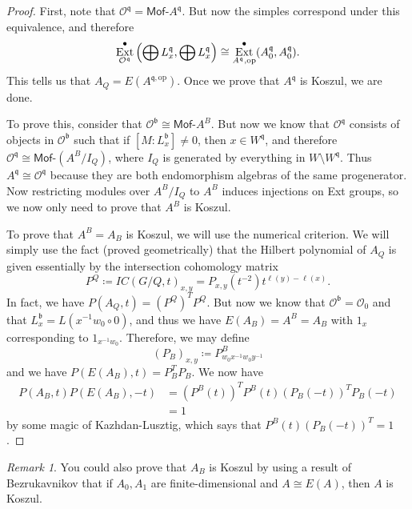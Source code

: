 \documentclass{amsart}
\theoremstyle{definition}
\theoremstyle{remark}
\newtheorem{rmk}[thm]{Remark}
\theoremstyle{plain}
\theoremstyle{definition}
\theoremstyle{remark}
\newcommand{\cO}{\mathcal{O}}
\renewcommand{\b}{\mathfrak{b}}
\newcommand{\mf}[1]{\mathfrak{#1}}
\newcommand{\mr}[1]{\mathrm{#1}}
\newcommand{\ms}[1]{\mathsf{#1}}
\DeclareMathOperator{\Ext}{Ext}
\begin{document}
\begin{proof}
    First, note that $\cO^{\mf{q}} = \ms{Mof}\text{-}A^{\mf{q}}$. But now the simples correspond under this equivalence, and therefore
    \[ \Ext_{\cO^{\mf{q}}}^{\bullet}\qty(\bigoplus L_x^{\mf{q}}, \bigoplus L_x^{\mf{q}}) \cong \Ext_{A^{\mf{q}}, \mr{op}}^{\bullet}(A_0^{\mf{q}}, A_0^{\mf{q}}). \]
    This tells us that $A_Q = E(A^{\mf{q}, \mr{op}})$. Once we prove that $A^{\mf{q}}$ is Koszul, we are done.

    To prove this, consider that $\cO^{\mf{b}} \cong \ms{Mof}\text{-}A^B$. But now we know that $\cO^{\mf{q}}$ consists of objects in $\cO^{\b}$ such that if $[M : L_x^{\mf{b}}] \neq 0$, then $x \in W^{\mf{q}}$, and therefore $\cO^{\mf{q}} \cong \ms{Mof}\text{-}(A^B/I_Q)$, where $I_Q$ is generated by everything in $W \setminus W^{\mf{q}}$. Thus $A^{\mf{q}} \cong \cO^{\mf{q}}$ because they are both endomorphism algebras of the same progenerator. Now restricting modules over $A^B/I_Q$ to $A^B$ induces injections on Ext groups, so we now only need to prove that $A^B$ is Koszul.

    To prove that $A^B = A_B$ is Koszul, we will use the numerical criterion. We will simply use the fact (proved geometrically) that the Hilbert polynomial of $A_Q$ is given essentially by the intersection cohomology matrix
    \[ P^Q \coloneqq IC(G/Q, t)_{x,y} = P_{x,y}(t^{-2})t^{\ell(y) - \ell(x)}. \]
    In fact, we have $P(A_Q, t) = (P^Q)^T P^Q$. But now we know that $\cO^{\b} = \cO_0$ and that $L_x^{\b} = L(x^{-1}w_0 \circ 0)$, and thus we have $E(A_B) = A^B = A_B$ with $1_x$ corresponding to $1_{x^{-1} w_0}$. Therefore, we may define
    \[ (P_B)_{x,y} \coloneqq P^B_{w_0 x^{-1} w_0 y^{-1}} \]
    and we have $P(E(A_B), t) = P_B^T P_B$. We now have
    \begin{align*}
        P(A_B, t)P(E(A_B), -t) &= (P^B(t))^T P^B(t) (P_B(-t))^T P_B(-t) \\
        &= 1
    \end{align*}
    by some magic of Kazhdan-Lusztig, which says that $P^B(t) (P_B(-t))^T = 1$.
\end{proof}

\begin{rmk}
    You could also prove that $A_B$ is Koszul by using a result of Bezrukavnikov that if $A_0, A_1$ are finite-dimensional and $A \cong E(A)$, then $A$ is Koszul.
\end{rmk}
\end{document}
